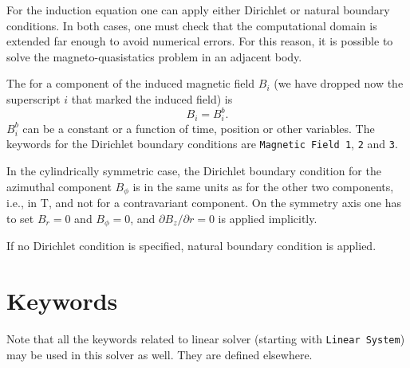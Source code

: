 For the induction equation one can apply either Dirichlet or natural boundary
conditions. In both cases, one must check that the computational domain is
extended far enough to avoid numerical errors. For this reason, it is possible
to solve the magneto-quasistatics problem in an adjacent body.

The  for a component of the induced
magnetic field $B_i$ (we have dropped now the superscript $i$ that marked
the induced field) is
\begin{equation}
B_i = B_i^b. 
\end{equation}
$B_i^b$ can be a constant or a function of time, position or other 
variables. The keywords for the Dirichlet boundary conditions are
{\tt Magnetic Field 1}, {\tt 2} and {\tt 3}.

In the cylindrically symmetric case, the Dirichlet boundary
condition for the azimuthal component $B_\phi$ is in the same units as for
the other two components, i.e., in T, and not for a contravariant component.
On the symmetry axis one has to set $B_r = 0$ and $B_\phi = 0$, and
$\partial B_z/\partial r = 0$  is applied implicitly.

If no Dirichlet condition is specified, natural boundary condition is applied.

\section{Keywords} 

\sifbegin
{} 
Note that all the keywords related to linear solver (starting with {\tt Linear System}) may be used in this solver as well.
They are defined elsewhere. 

